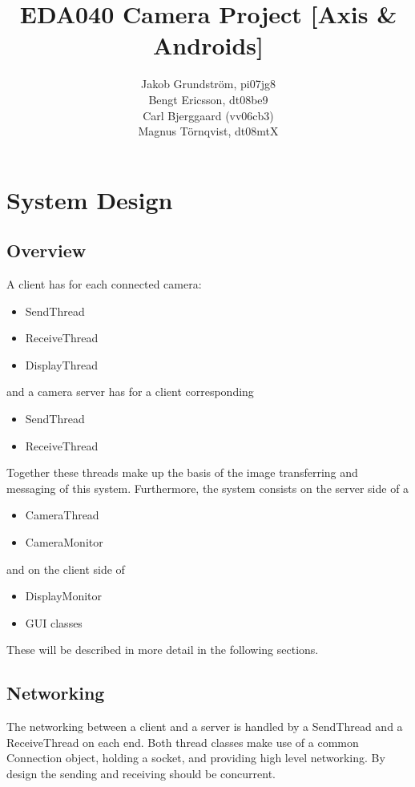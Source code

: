 \documentclass[8pt,titlepage]{article}
\title{EDA040 Camera Project [Axis \& Androids]}
\author{Jakob Grundström, pi07jg8 \\Bengt Ericsson, dt08be9 \\Carl Bjerggaard (vv06cb3) \\Magnus Törnqvist, dt08mtX}
\begin{document}
\maketitle

\section{System Design}

\subsection{Overview}
A client has for each connected camera:
\begin{itemize}
\item SendThread
\item ReceiveThread
\item DisplayThread
\end{itemize}

and a camera server has for a client corresponding
\begin{itemize}
\item SendThread
\item ReceiveThread
\end{itemize}

\noindent Together these threads make up the basis of the image transferring and messaging of this system. Furthermore, the system consists on the server side of a

\begin{itemize}
\item CameraThread
\item CameraMonitor
\end{itemize}

and on the client side of
\begin{itemize}
\item DisplayMonitor
\item GUI classes
\end{itemize}

These will be described in more detail in the following sections.

\subsection{Networking}
The networking between a client and a server is handled by a SendThread and a ReceiveThread on each end. Both thread classes make use of a common Connection object, holding a socket, and providing high level networking. By design the sending and receiving should be concurrent.
\end{document}
